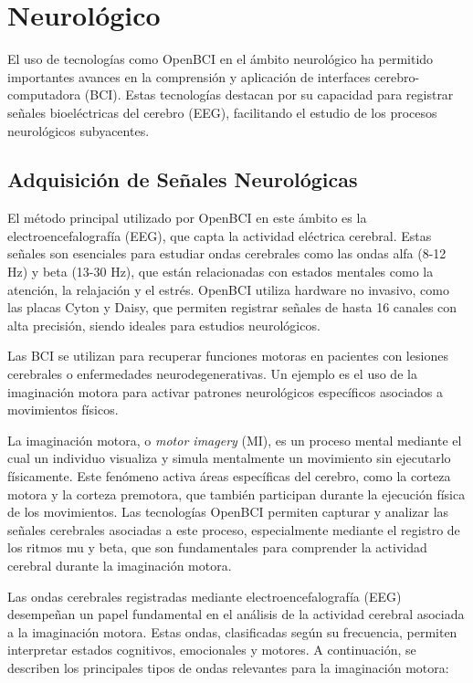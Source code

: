 \section{Neurológico}

El uso de tecnologías como OpenBCI en el ámbito neurológico ha permitido importantes avances en la comprensión y aplicación de interfaces cerebro-computadora (BCI). Estas tecnologías destacan por su capacidad para registrar señales bioeléctricas del cerebro (EEG), facilitando el estudio de los procesos neurológicos subyacentes.

\subsection{Adquisición de Señales Neurológicas}
El método principal utilizado por OpenBCI en este ámbito es la electroencefalografía (EEG), que capta la actividad eléctrica cerebral. Estas señales son esenciales para estudiar ondas cerebrales como las ondas alfa (8-12 Hz) y beta (13-30 Hz), que están relacionadas con estados mentales como la atención, la relajación y el estrés. OpenBCI utiliza hardware no invasivo, como las placas Cyton y Daisy, que permiten registrar señales de hasta 16 canales con alta precisión, siendo ideales para estudios neurológicos.

Las BCI se utilizan para recuperar funciones motoras en pacientes con lesiones cerebrales o enfermedades neurodegenerativas. Un ejemplo es el uso de la imaginación motora para activar patrones neurológicos específicos asociados a movimientos físicos.

La imaginación motora, o \textit{motor imagery} (MI), es un proceso mental mediante el cual un individuo visualiza y simula mentalmente un movimiento sin ejecutarlo físicamente. Este fenómeno activa áreas específicas del cerebro, como la corteza motora y la corteza premotora, que también participan durante la ejecución física de los movimientos. Las tecnologías OpenBCI permiten capturar y analizar las señales cerebrales asociadas a este proceso, especialmente mediante el registro de los ritmos mu y beta, que son fundamentales para comprender la actividad cerebral durante la imaginación motora.

Las ondas cerebrales registradas mediante electroencefalografía (EEG) desempeñan un papel fundamental en el análisis de la actividad cerebral asociada a la imaginación motora. Estas ondas, clasificadas según su frecuencia, permiten interpretar estados cognitivos, emocionales y motores. A continuación, se describen los principales tipos de ondas relevantes para la imaginación motora:

